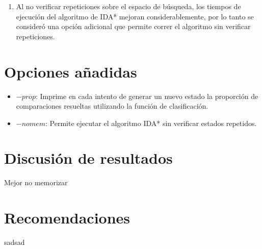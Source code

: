 \documentclass[letterpaper,12pt, titlepage]{article}
\begin{document}
\begin{enumerate}
\item Al no verificar repeticiones sobre el espacio de búsqueda,
los tiempos de ejecución del algoritmo de IDA* mejoran considerablemente,
por lo tanto se consideró una opción adicional que permite correr el
algoritmo sin verificar repeticiones.
\end{enumerate}

\section{Opciones añadidas}

\begin{itemize}
\item $-prop$: Imprime en cada intento de generar un nuevo estado
la proporción de comparaciones resueltas utilizando la función de
clasificación.

\item $-nomem$: Permite ejecutar el algoritmo IDA* sin verificar
estados repetidos.

\end{itemize}

\section{Discusión de resultados}
Mejor no memorizar
\section{Recomendaciones}
sadsad
\end{document}
